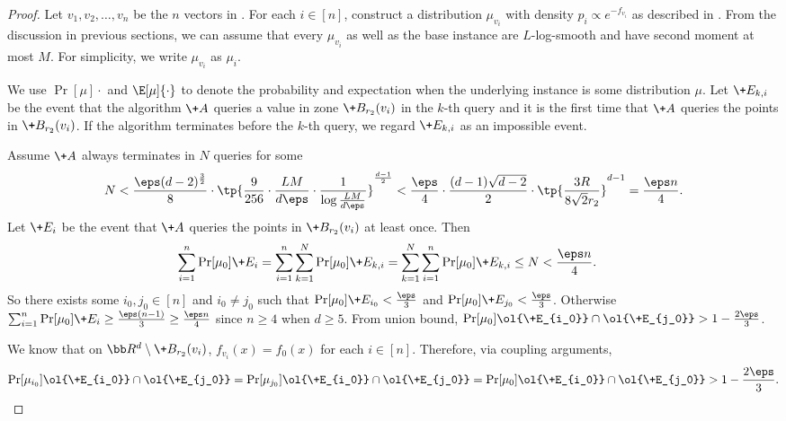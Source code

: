 \begin{proof}
    Let $v_1,v_2,\dots,v_n$ be the $n$ vectors in . For each $i\in [n]$, construct a distribution $\mu_{v_i}$ with density $p_i \propto e^{-f_{v_i}}$ as described in . From the discussion in previous sections, we can assume that every $\mu_{v_i}$ as well as the base instance are $L$-log-smooth and have second moment at most $M$. For simplicity, we write $\mu_{v_i}$ as $\mu_i$.

    We use $\Pr[\mu]{\cdot}$ and $\E[\mu]{\cdot}$ to denote the probability and expectation when the underlying instance is some distribution $\mu$. Let $\+E_{k,i}$ be the event that the algorithm $\+A$ queries a value in zone $\+B_{r_2}(v_i)$ in the $k$-th query and it is the first time that $\+A$ queries the points in $\+B_{r_2}(v_i)$. If the algorithm terminates before the $k$-th query, we regard $\+E_{k,i}$ as an impossible event.

    Assume $\+A$ always terminates in $N$ queries for some 
    $$
        N< \frac{\eps (d-2)^{\frac{3}{2}}}{8}\cdot \tp{\frac{9}{256}\cdot \frac{LM}{d\eps} \cdot \frac{1}{\log \frac{LM}{d\eps}}}^{\frac{d-1}{2}} < \frac{\eps}{4}\cdot \frac{(d-1)\sqrt{d-2}}{2}\cdot \tp{\frac{3R}{8\sqrt{2}r_2}}^{d-1} = \frac{\eps n}{4}.
    $$ 
    Let $\+E_{i}$ be the event that $\+A$ queries the points in $\+B_{r_2}(v_i)$ at least once. Then
    \begin{align*}
        \sum_{i=1}^n \Pr[\mu_0]{\+E_i}& = \sum_{i=1}^n \sum_{k=1}^N \Pr[\mu_0]{\+E_{k,i}} = \sum_{k=1}^N \sum_{i=1}^n \Pr[\mu_0]{\+E_{k,i}} \leq N<\frac{\eps n}{4}.
    \end{align*}
    So there exists some $i_0,j_0\in[n]$ and $i_0\neq j_0$ such that $\Pr[\mu_0]{\+E_{i_0}}<\frac{\eps}{3}$ and $\Pr[\mu_0]{\+E_{j_0}}<\frac{\eps}{3}$. Otherwise $\sum_{i=1}^n \Pr[\mu_0]{\+E_i}\geq \frac{\eps(n-1)}{3}\geq \frac{\eps n}{4}$ since $n\geq 4$ when $d\geq 5$. From union bound, $\Pr[\mu_0]{\ol{\+E_{i_0}}\cap \ol{\+E_{j_0}}}> 1-\frac{2\eps}{3}$. 
    
    We know that on $\bb R^d\setminus \+B_{r_2}(v_i)$, $f_{v_i}(x)=f_0(x)$ for each $i\in[n]$. Therefore, via coupling arguments,
    \[
        \Pr[\mu_{i_0}]{\ol{\+E_{i_0}}\cap \ol{\+E_{j_0}}} = \Pr[\mu_{j_0}]{\ol{\+E_{i_0}}\cap \ol{\+E_{j_0}}} = \Pr[\mu_0]{\ol{\+E_{i_0}}\cap \ol{\+E_{j_0}}}> 1-\frac{2\eps}{3}.
    \]


\end{proof}
